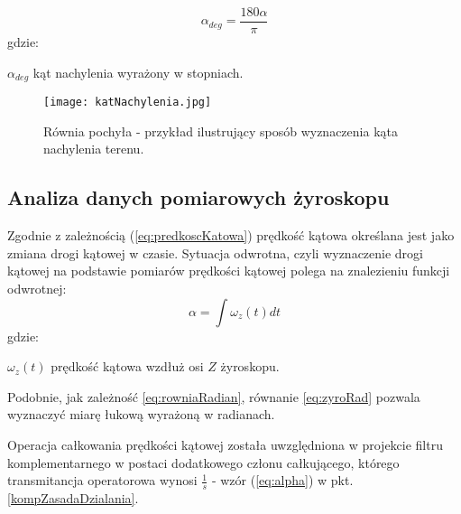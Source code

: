 \begin{equation}
    \alpha_{deg}=\frac{180\alpha}{\pi}
    \label{eq:rowniaStopnie}
\end{equation}
gdzie:
\begin{eqwhere}[2cm]
	\item[$\alpha_{deg}$] kąt nachylenia wyrażony w stopniach.
\end{eqwhere}
\begin{figure}[h]
    \centering
    \texttt{[image: katNachylenia.jpg]}
    \caption{Równia pochyła - przykład ilustrujący sposób wyznaczenia kąta nachylenia terenu.}
    \label{fig:rownia}
\end{figure}
\subsection{Analiza danych pomiarowych żyroskopu}
\label{gyro}
Zgodnie z zależnością (\ref{eq:predkoscKatowa}) prędkość kątowa określana jest jako zmiana drogi kątowej w czasie. Sytuacja odwrotna, czyli wyznaczenie drogi kątowej na podstawie pomiarów prędkości kątowej polega na znalezieniu funkcji odwrotnej:
\begin{equation}  
    \alpha = \int{\omega_{z}(t)dt}
    \label{eq:zyroRad}
\end{equation}
gdzie:
\begin{eqwhere}[2cm]
	\item[$\omega_{z}(t)$] prędkość kątowa wzdłuż osi $Z$ żyroskopu.
	
\end{eqwhere}

Podobnie, jak zależność \ref{eq:rowniaRadian}, równanie \ref{eq:zyroRad} pozwala wyznaczyć miarę łukową wyrażoną w radianach.

Operacja całkowania prędkości kątowej została uwzględniona w projekcie filtru komplementarnego w postaci dodatkowego członu całkującego, którego transmitancja operatorowa wynosi $\frac{1}{s}$ - wzór (\ref{eq:alpha}) w pkt. \ref{kompZasadaDzialania}.

